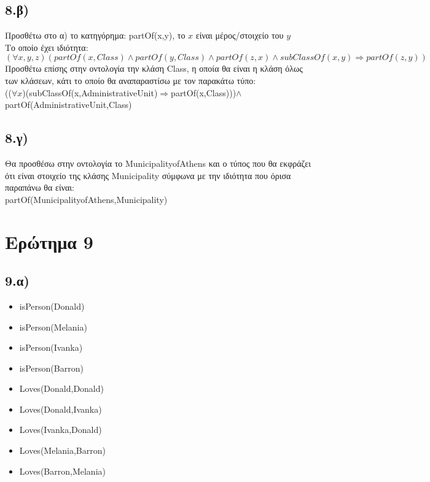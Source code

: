 \documentclass[12pt,a4paper]{article}
\begin{document}
\subsection*{8.β)}
Προσθέτω στο α) το κατηγόρημα: \textlatin{partOf(x,y)}, το $x$ είναι μέρος/στοιχείο του $y$\\
Το οποίο έχει ιδιότητα:\\
\textlatin{$(\forall x,y,z)(partOf(x,Class)\wedge partOf(y,Class)\wedge partOf(z,x)\wedge subClassOf(x,y) \Rightarrow partOf(z,y))$}\\
Προσθέτω επίσης στην οντολογία την κλάση Class, η οποία θα είναι η κλάση όλως των κλάσεων, κάτι το οποίο θα αναπαραστίσω με τον παρακάτω τύπο:\\
\textlatin{(($\forall x$)(subClassOf(x,AdministrativeUnit)$\Rightarrow$partOf(x,Class)))$\wedge$ partOf(AdministrativeUnit,Class)}\vspace{3mm}\\

\subsection*{8.γ)}
Θα προσθέσω στην οντολογία το \textlatin{MunicipalityofAthens} και ο τύπος που θα εκφράζει ότι είναι στοιχείο της κλάσης \textlatin{Municipality} σύμφωνα με την ιδιότητα που όρισα παραπάνω θα είναι:\\
\textlatin{partOf(MunicipalityofAthens,Municipality)}



\section*{Ερώτημα 9}

\subsection*{9.α)}
\begin{itemize}
\item\textlatin{isPerson(Donald)}
\item\textlatin{isPerson(Melania)}
\item\textlatin{isPerson(Ivanka)}
\item\textlatin{isPerson(Barron)}
\item\textlatin{Loves(Donald,Donald)}
\item\textlatin{Loves(Donald,Ivanka)}
\item\textlatin{Loves(Ivanka,Donald)}
\item\textlatin{Loves(Melania,Barron)}
\item\textlatin{Loves(Barron,Melania)}
\end{itemize}
\end{document}
